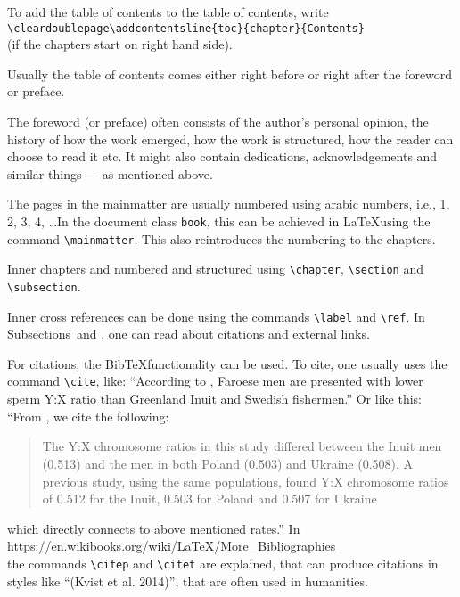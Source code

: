 To add the table of contents to the table of contents, write \\
\texttt{\textbackslash cleardoublepage\textbackslash addcontentsline\{toc\}\{chapter\}\{Contents\}}\\
(if the chapters start on right hand side). 

Usually the table of contents comes either right before or right after the foreword or preface. 

The foreword (or preface) often consists of the author's personal opinion, the history of how the work emerged, how the work is structured, how the reader can choose to read it etc. It might also contain dedications, acknowledgements and similar things --- as mentioned above. 

The pages in the mainmatter are usually numbered using arabic numbers, i.e., 1, 2, 3, 4, \ldots In the document class \texttt{book}, this can be achieved in \LaTeX using the command 
\texttt{\textbackslash mainmatter}. This also reintroduces the numbering to the chapters.

Inner chapters and numbered and structured using \texttt{\textbackslash chapter}, \texttt{\textbackslash section} and \texttt{\textbackslash subsection}. 



Inner cross references can be done using the commands \texttt{\textbackslash label} and \texttt{\textbackslash ref}. In Subsections~\MISSINGCOMMAND and \MISSINGCOMMAND, one can read about citations and external links. 

For citations, the Bib\TeX functionality can be used. To cite, one usually uses the command \texttt{\textbackslash cite}, like: ``According to \MISSINGCOMMAND,  Faroese men are presented with lower sperm Y:X ratio than Greenland Inuit and Swedish fishermen.'' Or like this: ``From \MISSINGCOMMAND, we cite the following:
\begin{quote}
The Y:X chromosome ratios in this study differed between the Inuit men (0.513) and the men in both Poland (0.503) and Ukraine (0.508). A previous study, using the same populations, found Y:X chromosome ratios of 0.512 for the Inuit, 0.503 for Poland and 0.507 for Ukraine
\end{quote}
which directly connects to above mentioned rates.''
In \\
\url{https://en.wikibooks.org/wiki/LaTeX/More_Bibliographies}\\ 
the commands \texttt{\textbackslash citep} and \texttt{\textbackslash citet} are explained, that can produce citations in styles like ``(Kvist et al. 2014)'', that are often used in humanities. 

